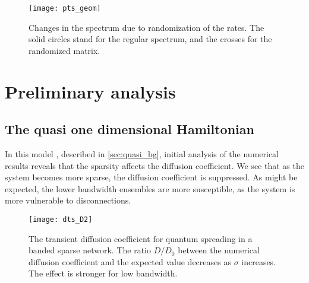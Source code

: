 \begin{figure}
\texttt{[image: pts\_geom]}
\caption{Changes in the spectrum due to randomization of the rates. The solid circles 
  stand for the regular spectrum, and the crosses for the randomized matrix.}
\label{fig:rand}
\end{figure}


\chapter{Preliminary analysis}

\section{The quasi one dimensional Hamiltonian}


In this model , described in \autoref{sec:quasi_bg}, initial analysis of
the numerical results reveals that the sparsity affects the diffusion coefficient.
We see that as the system becomes more sparse, the diffusion coefficient is suppressed. 
As might be expected, the lower bandwidth ensembles are more
susceptible, as the system is more vulnerable to disconnections.



\begin{figure}
\texttt{[image: dts\_D2]}
\caption{The transient diffusion coefficient for quantum spreading in
a banded sparse network. The ratio $D/D_0$ between the numerical diffusion 
coefficient and the expected value decreases as $\sigma$ increases. The effect
is stronger for low bandwidth.}
\end{figure}
